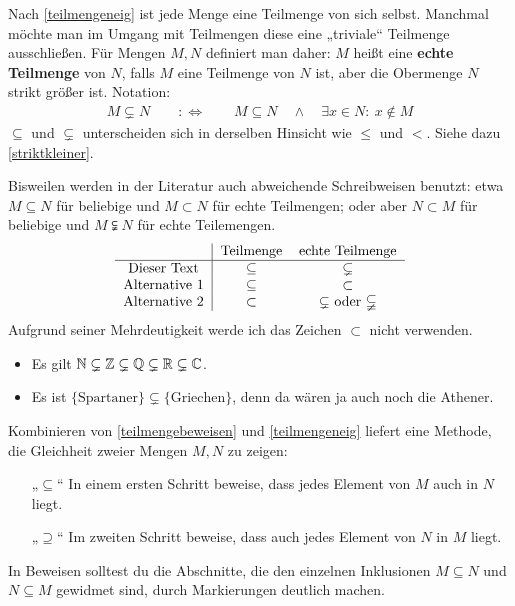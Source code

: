 \begin{nota}
    Nach \cref{teilmengeneig} ist jede Menge eine Teilmenge von sich selbst. Manchmal möchte man im Umgang mit Teilmengen diese eine „triviale“ Teilmenge ausschließen. Für Mengen $M,N$ definiert man daher: $M$ heißt eine \textbf{echte Teilmenge} von $N$, falls $M$ eine Teilmenge von $N$ ist, aber die Obermenge $N$ strikt größer ist. Notation:
        \begin{align*}
            M\subsetneq N \qquad:\Leftrightarrow\qquad M\subseteq N\quad \land\quad \exists x\in N:\ x\notin M
        \end{align*}
    $\subseteq$ und $\subsetneq$ unterscheiden sich in derselben Hinsicht wie $\le$ und $<$. Siehe dazu \cref{striktkleiner}.

    Bisweilen werden in der Literatur auch abweichende Schreibweisen benutzt: etwa $M\subseteq N$ für beliebige und $M\subset N$ für echte Teilmengen; oder aber $N\subset M$ für beliebige und $M\subsetneqq N$ für echte Teilemengen.
    \[\begin{tabular}{c|ccc}
        & Teilmenge & echte Teilmenge \\ \hline
        Dieser Text & $\subseteq$ & $\subsetneq$ \\
        Alternative 1 & $\subseteq$ & $\subset$ \\
        Alternative 2 & $\subset$ & $\subsetneq$ oder $\subsetneqq$
    \end{tabular}\]
    Aufgrund seiner Mehrdeutigkeit werde ich das Zeichen $\subset$ nicht verwenden.
\end{nota}


\begin{bsp} \quad
    \begin{itemize}
        \item Es gilt $\mathbb N\subsetneq\mathbb Z\subsetneq\mathbb Q\subsetneq\mathbb R\subsetneq\mathbb C$.
        \item Es ist $\{\text{Spartaner}\}\subsetneq \{\text{Griechen}\}$, denn da wären ja auch noch die Athener.
    \end{itemize}
\end{bsp}


\begin{bem} \label{mengengleichbeweis}
    Kombinieren von \cref{teilmengebeweisen} und \cref{teilmengeneig} liefert eine Methode, die Gleichheit zweier Mengen $M,N$ zu zeigen:
    \begin{itemize}
        \item[„$\subseteq$“] In einem ersten Schritt beweise, dass jedes Element von $M$ auch in $N$ liegt.
        \item[„$\supseteq$“] Im zweiten Schritt beweise, dass auch jedes Element von $N$ in $M$ liegt.
    \end{itemize}
    In Beweisen solltest du die Abschnitte, die den einzelnen Inklusionen $M\subseteq N$ und $N\subseteq M$ gewidmet sind, durch Markierungen deutlich machen.
\end{bem}


